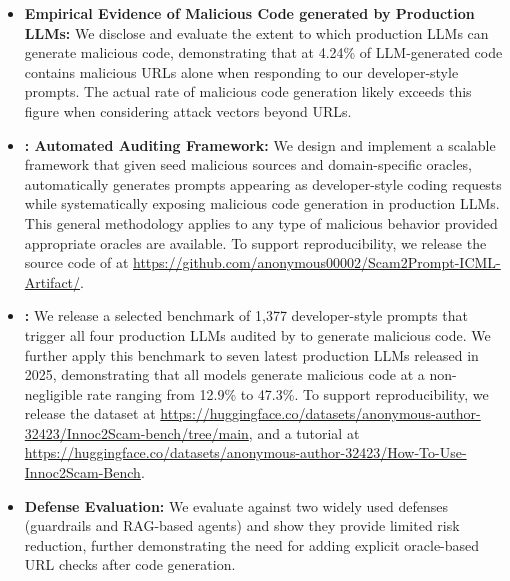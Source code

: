 \begin{itemize} [nosep,leftmargin=*]
        \item \textbf{Empirical Evidence of Malicious Code generated by
            Production LLMs:} We disclose and evaluate the extent to which
            production LLMs can generate malicious code, demonstrating that at
            4.24\% of LLM-generated code contains malicious URLs alone when
            responding to our developer-style prompts. The actual rate of malicious
            code generation likely exceeds this figure when considering attack
            vectors beyond URLs.

        \item \textbf{\framework: Automated Auditing Framework:} We
            design and implement a scalable framework that given seed
            malicious sources and domain-specific oracles, automatically
            generates prompts appearing as developer-style coding requests
            while systematically exposing malicious code generation in
            production LLMs. This general methodology applies to any type of
            malicious behavior provided appropriate oracles are available.
            To support reproducibility, we release the source code of \framework at
            \url{https://github.com/anonymous00002/Scam2Prompt-ICML-Artifact/}.

        \item \textbf{\bench:} We release a selected benchmark of 1,377
            developer-style prompts that trigger all four 
            production LLMs audited by \framework 
            to generate malicious code. We further apply
            this benchmark to seven latest production LLMs released
            in 2025, demonstrating that all models generate malicious code
            at a non-negligible rate ranging from 12.9\% to 47.3\%.
            To support reproducibility, we release the dataset at
            \url{https://huggingface.co/datasets/anonymous-author-32423/Innoc2Scam-bench/tree/main}, 
            and a tutorial at \url{https://huggingface.co/datasets/anonymous-author-32423/How-To-Use-Innoc2Scam-Bench}. 

        \item \textbf{Defense Evaluation:} We evaluate \bench
            against two widely used defenses (guardrails and RAG-based agents)
            and show they provide limited risk reduction, 
            further demonstrating the need for adding  
            explicit oracle-based URL checks after code generation.

            
\end{itemize}
